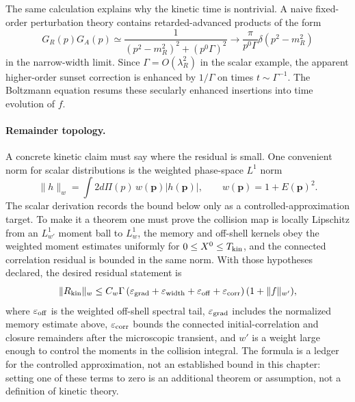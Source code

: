 The same calculation explains why the kinetic time is nontrivial.  A naive
fixed-order perturbation theory contains retarded-advanced products of the
form
\begin{equation}
  G_R(p)G_A(p)
  \simeq
  \frac{1}{(p^2-m_R^2)^2+(p^0\Gamma)^2}
  \longrightarrow
  \frac{\pi}{p^0\Gamma}\delta(p^2-m_R^2)
  \label{eq:kinetic-pinch-enhancement}
\end{equation}
in the narrow-width limit.  Since \(\Gamma=O(\lambda_R^2)\) in the scalar
example, the apparent higher-order sunset correction is enhanced by
\(1/\Gamma\) on times \(t\sim\Gamma^{-1}\).  The Boltzmann equation resums
these secularly enhanced insertions into time evolution of \(f\).

\paragraph{Remainder topology.}
A concrete kinetic claim must say where the residual is small.  One convenient
norm for scalar distributions is the weighted phase-space \(L^1\) norm
\[
  \|h\|_{w}
  =
  \int 2d\Pi(p)\,w(\mathbf p)|h(\mathbf p)|,
  \qquad
  w(\mathbf p)=1+E(\mathbf p)^2 .
\]
The scalar derivation records the bound below only as a
controlled-approximation target.  To make it a theorem
one must prove the collision map is locally Lipschitz from an \(L^1_{w'}\)
moment ball to \(L^1_w\), the memory and off-shell kernels obey the weighted
moment estimates uniformly for \(0\le X^0\le T_{\rm kin}\), and the connected
correlation residual is bounded in the same norm.  With those hypotheses
declared, the desired residual statement is
\begin{equation}
  \|R_{\rm kin}\|_{w}
  \le
  C_w\Gamma
  \left(
    \varepsilon_{\rm grad}
    +
    \varepsilon_{\rm width}
    +
    \varepsilon_{\rm off}
    +
    \varepsilon_{\rm corr}
  \right)
  (1+\|f\|_{w'}),
  \label{eq:kinetic-scalar-remainder-ledger}
\end{equation}
where \(\varepsilon_{\rm off}\) is the weighted off-shell spectral tail,
\(\varepsilon_{\rm grad}\) includes the normalized memory estimate above,
\(\varepsilon_{\rm corr}\) bounds the connected initial-correlation and
closure remainders after the microscopic transient, and \(w'\) is a weight
large enough to control the moments in the collision integral.  The formula is
a ledger for the controlled approximation, not an established bound in this
chapter: setting one of these terms to zero is an additional theorem or
assumption, not a definition of kinetic theory.

